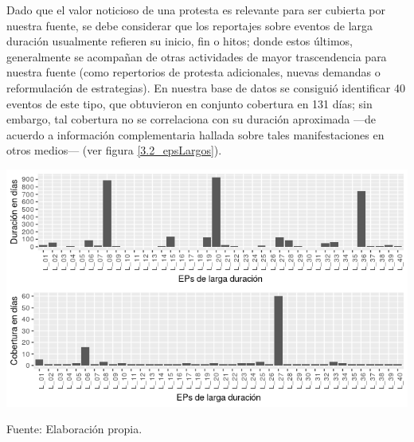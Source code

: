 \documentclass[letterpaper, 11pt]{book}
\theoremstyle{definition}
\theoremstyle{remark}
\begin{document}
Dado que el valor noticioso de una protesta es relevante para ser cubierta por nuestra fuente, se debe considerar que los reportajes sobre eventos de larga duración usualmente refieren su inicio, fin o hitos; donde estos últimos, generalmente se acompañan de otras actividades de mayor trascendencia para nuestra fuente (como repertorios de protesta adicionales, nuevas demandas o reformulación de estrategias). 
En nuestra base de datos se consiguió identificar 40 eventos de este tipo, que obtuvieron en conjunto cobertura en 131 días; sin embargo, tal cobertura no se correlaciona con su duración aproximada ---de acuerdo a información complementaria hallada sobre tales manifestaciones en otros medios--- (ver figura \ref{3.2_epsLargos}). 


\hspace{-1.5em}\begin{minipage}{\linewidth}
\centering
{} \label{3.2_epsLargos}
\hspace{-1.5em}\includegraphics[scale=0.85]{img/3.2_epsLargos.png}
\par\bigskip
\small Fuente: Elaboración propia.
\end{minipage}\bigskip
\end{document}
